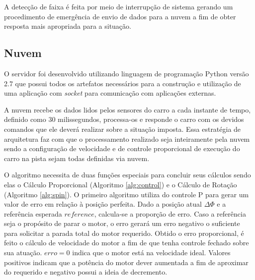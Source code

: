 			A detecção de faixa é feita por meio de interrupção de sistema gerando um procedimento de emergência de envio de dados para a nuvem a fim de obter resposta mais apropriada para a situação.


	\subsection{Nuvem} \label{sec:nuvem}

		O servidor foi desenvolvido utilizando linguagem de programação Python versão 2.7 que possui todos os artefatos necessários para a construção e utilização de uma aplicação com \textit{socket} para comunicação com aplicações externas.

		A nuvem recebe os dados lidos pelos sensores do carro a cada instante de tempo, definido como $30$ milissegundos, processa-os e responde o carro com os devidos comandos que ele deverá realizar sobre a situação imposta. Essa estratégia de arquitetura faz com que o processamento realizado seja inteiramente pela nuvem sendo a configuração de velocidade e de controle proporcional de execução do carro na pista sejam todas definidas via nuvem.

		
        O algoritmo necessita de duas funções especiais para concluir seus cálculos sendo elas o Cálculo Proporcional (Algoritmo \ref{alg:control}) e o Cálculo de Rotação (Algoritmo \ref{alg:spin}). O primeiro algoritmo utiliza do controle P para gerar um valor de erro em relação à posição perfeita. Dado a posição atual $\Delta \Phi$ e a referência esperada $reference$, calcula-se a proporção de erro. Caso a referência seja o propósito de parar o motor, o erro 
        gerará um erro negativo o suficiente para solicitar a parada total do motor requerido. Obtido o erro proporcional, é feito o cálculo de velocidade do motor a fim de que tenha controle fechado sobre sua atuação. $erro = 0$ indica que o motor está na velocidade ideal. Valores positivos indicam que a potência do motor dever aumentada a fim de aproximar do requerido e negativo possui a ideia de decremento.

